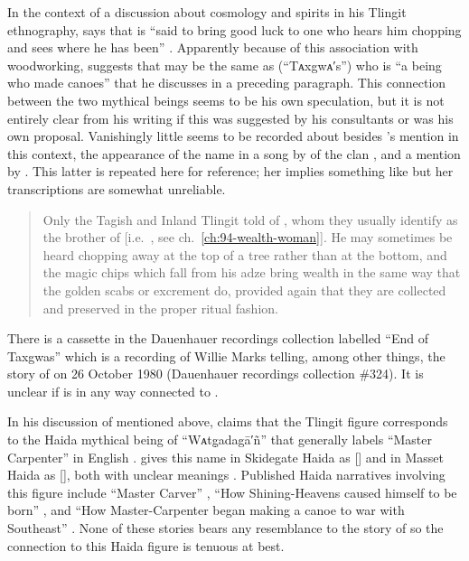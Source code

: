 In the context of a discussion about cosmology and spirits in his Tlingit ethnography, \citeauthor{swanton:1908} says that  is “said to bring good luck to one who hears him chopping and sees where he has been” \parencite[460]{swanton:1908}.
Apparently because of this association with woodworking, \citeauthor{swanton:1908} suggests that  may be the same as  (“Tᴀxgwᴀ′s”) who is “a being who made canoes” that he discusses in a preceding paragraph.
This connection between the two mythical beings seems to be his own speculation, but it is not entirely clear from his writing if this was suggested by his consultants or was his own proposal.
Vanishingly little seems to be recorded about  besides \citeauthor{swanton:1908}’s mention in this context, the appearance of the name in a song by  of the  clan \parencite[410–411 \#82]{swanton:1909}, and a mention by \citeauthor{mcclellan:1975b}.
This latter is repeated here for reference; her  implies something like  but her transcriptions are somewhat unreliable.

\begin{quote}\small
Only the Tagish and Inland Tlingit told of , whom they usually identify as the brother of  [i.e.\ , see ch.\ \ref{ch:94-wealth-woman}].
He may sometimes be heard chopping away at the top of a tree rather than at the bottom, and the magic chips which fall from his adze bring wealth in the same way that the golden scabs or excrement do, provided again that they are collected and preserved in the proper ritual fashion.
\end{quote}

There is a cassette in the Dauenhauer recordings collection labelled “End of Taxgwas” which is a recording of  Willie Marks telling, among other things, the story of  on 26 October 1980 (Dauenhauer recordings collection \#324).
It is unclear if  is in any way connected to .

In his discussion of  mentioned above, \citeauthor{swanton:1908} claims that the Tlingit figure corresponds to the Haida mythical being of “Wᴀtg̣adagā′ñ” that \citeauthor{swanton:1909} generally labels “Master Carpenter” in English \parencite[30]{swanton:1905b}.
\citeauthor{enrico:2005} gives this name in Skidegate Haida as  [] and in Masset Haida as  [], both with unclear meanings \parencite[1623]{enrico:2005}.
Published Haida narratives involving this figure include “Master Carver” \parencite[91]{garfield-forrest:1948}, “How Shining-Heavens caused himself to be born” \parencites[26–31]{swanton:1905b}[284–292]{swanton:1908a}, and “How Master-Carpenter began making a canoe to war with Southeast” \parencite[32–35]{swanton:1905b}.
None of these stories bears any resemblance to the story of  so the connection to this Haida figure is tenuous at best.

